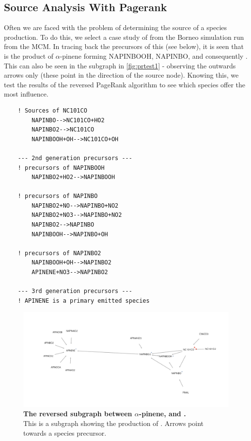 \subsection{Source Analysis With Pagerank}
Often we are faced with the problem of determining the source of a species production. To do this, we select a case study of  from the Borneo simulation run from the MCM. In tracing back the precursors of this (see below), it is seen that  is the product of $\alpha$-pinene forming NAPINBOOH, NAPINBO,  and consequently . This can also be seen in the subgraph in \autoref{fig:prtest1} - observing the outwards arrows only (these point in the direction of the source node).
 Knowing this, we test the results of the reversed PageRank algorithm to see which species offer the most influence.

\newpage

\begin{verbatim}
    ! Sources of NC101CO
        NAPINBO-->NC101CO+HO2
        NAPINBO2-->NC101CO
        NAPINBOOH+OH-->NC101CO+OH

    --- 2nd generation precursors ---
    ! precursors of NAPINBOOH
        NAPINBO2+HO2-->NAPINBOOH

    ! precursors of NAPINBO
        NAPINBO2+NO-->NAPINBO+NO2
        NAPINBO2+NO3-->NAPINBO+NO2
        NAPINBO2-->NAPINBO
        NAPINBOOH-->NAPINBO+OH

    ! precursors of NAPINBO2
        NAPINBOOH+OH-->NAPINBO2
        APINENE+NO3-->NAPINBO2

    --- 3rd generation precursors ---
    ! APINENE is a primary emitted species
\end{verbatim}


\begin{figure}[H]
  \centering
  \includegraphics[width=1.1\textwidth]{figures_c3/prtest1.png}
\caption{\textbf{The reversed subgraph between $\alpha$-pinene, and .}\\ This is a subgraph showing the production of . Arrows point towards a species precursor. }
\label{fig:prtest1}
\end{figure}


